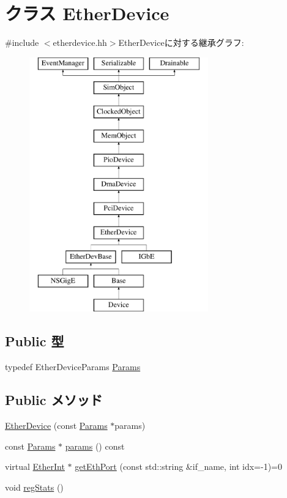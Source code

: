\hypertarget{classEtherDevice}{
\section{クラス EtherDevice}
\label{classEtherDevice}
}


{\ttfamily \#include $<$etherdevice.hh$>$}EtherDeviceに対する継承グラフ:\begin{figure}[H]
\begin{center}
\leavevmode
\includegraphics[height=11cm]{classEtherDevice}
\end{center}
\end{figure}
\subsection*{Public 型}
\begin{DoxyCompactItemize}
\item 
typedef EtherDeviceParams \hyperlink{classEtherDevice_afcf43c7944288000e850f783bdd66b9d}{Params}
\end{DoxyCompactItemize}
\subsection*{Public メソッド}
\begin{DoxyCompactItemize}
\item 
\hyperlink{classEtherDevice_a6f5090c40cfd553717f2e6048e0246cc}{EtherDevice} (const \hyperlink{classEtherDevice_afcf43c7944288000e850f783bdd66b9d}{Params} $\ast$params)
\item 
const \hyperlink{classEtherDevice_afcf43c7944288000e850f783bdd66b9d}{Params} $\ast$ \hyperlink{classEtherDevice_acd3c3feb78ae7a8f88fe0f110a718dff}{params} () const 
\item 
virtual \hyperlink{classEtherInt}{EtherInt} $\ast$ \hyperlink{classEtherDevice_ac1aa24c1f8c0f1ee8bdc3f3d3799f67c}{getEthPort} (const std::string \&if\_\-name, int idx=-\/1)=0
\item 
void \hyperlink{classEtherDevice_a4dc637449366fcdfc4e764cdf12d9b11}{regStats} ()
\end{DoxyCompactItemize}
